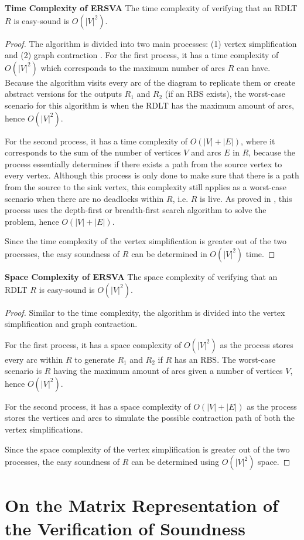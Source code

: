 \begin{thm}\textbf{Time Complexity of ERSVA}
    The time complexity of verifying that an RDLT $ R $ is easy-sound is $ O(|V|^2) $.
    \label{TCERSVA}
\end{thm}
\begin{proof}
    The algorithm is divided into two main processes: (1) vertex simplification \cite{Malinao2017} and (2) graph contraction \cite{Malinao2017, MalinaoPJS2023}. For the first process, it has a time complexity of $ O(|V|^2)$ which corresponds to the maximum number of arcs $ R $ can have. Because the algorithm visits every arc of the diagram to replicate them or create abstract versions for the outputs $ R_1 $ and $ R_2 $ (if an RBS exists), the worst-case scenario for this algorithm is when the RDLT has the maximum amount of arcs, hence $ O(|V|^2) $. 
    
    For the second process, it has a time complexity of $ O(|V|+|E|)$, where it corresponds to the sum of the number of vertices $ V $ and arcs $ E $ in $ R $, because the process essentially determines if there exists a path from the source vertex to every vertex. Although this process is only done to make sure that there is a path from the source to the sink vertex, this complexity still applies as a worst-case scenario when there are no deadlocks within $ R $, i.e. $ R $ is live. As proved in \cite{MalinaoPJS2023}, this process uses the depth-first or breadth-first search algorithm to solve the problem, hence $ O(|V|+|E|) $.

    Since the time complexity of the vertex simplification is greater out of the two processes, the easy soundness of $ R $ can be determined in $ O(|V|^2) $ time.
\end{proof}

\begin{thm}\textbf{Space Complexity of ERSVA}
    \label{SCERSVA}
    The space complexity of verifying that an RDLT $ R $ is easy-sound is $ O(|V|^2) $.
\end{thm}
\begin{proof}
    Similar to the time complexity, the algorithm is divided into the vertex simplification and graph contraction. 
    
    For the first process, it has a space complexity of $ O(|V|^2)$ as the process stores every arc within $ R $ to generate $ R_1 $ and $ R_2 $ if $ R $ has an RBS. The worst-case scenario is $ R $ having the maximum amount of arcs given a number of vertices $ V $,  hence $ O(|V|^2) $. 

    For the second process, it has a space complexity of $ O(|V| + |E|) $ \cite{MalinaoPJS2023} as the process stores the vertices and arcs to simulate the possible contraction path of both the vertex simplifications. 

    Since the space complexity of the vertex simplification is greater out of the two processes, the easy soundness of $ R $ can be determined using $ O(|V|^2) $ space.
\end{proof}
\newpage
\section*{On the Matrix Representation of the Verification of Soundness}
\subsection*{}
